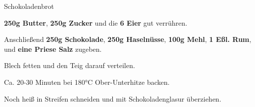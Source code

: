 \begin{recipe}[]{Schokoladenbrot} %

\step
\textbf{250g Butter}, \textbf{250g Zucker} und die \textbf{6 Eier} gut verrühren.

\step
Anschließend \textbf{250g Schokolade}, \textbf{250g Haselnüsse}, \textbf{100g Mehl}, \textbf{1 Eßl. Rum},  und \textbf{eine Priese Salz} zugeben.

\step
Blech fetten und den Teig darauf verteilen.

\step
Ca. 20-30 Minuten bei 180°C Ober-Unterhitze backen.

\step
Noch heiß in Streifen schneiden und mit Schokoladenglasur überziehen.

\end{recipe}